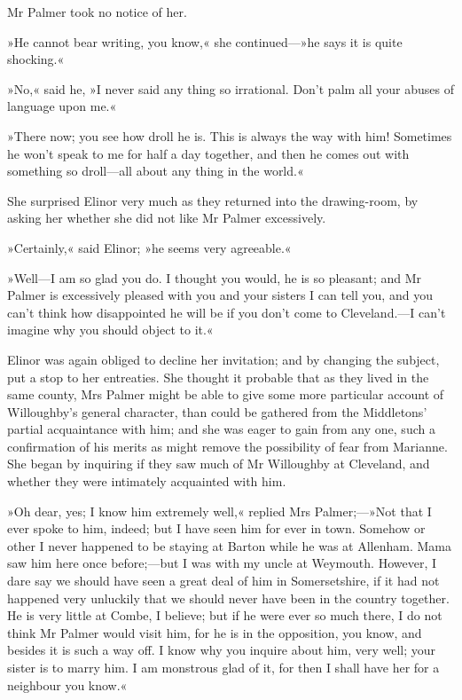 Mr Palmer took no notice of her.

»He cannot bear writing, you know,« she continued—»he says it is quite shocking.«

»No,« said he, »I never said any thing so irrational. Don’t palm all your abuses of language upon me.«

»There now; you see how droll he is. This is always the way with him! Sometimes he won’t speak to me for half a day together, and then he comes out with something so droll—all about any thing in the world.«

She surprised Elinor very much as they returned into the drawing-room, by asking her whether she did not like Mr Palmer excessively.

»Certainly,« said Elinor; »he seems very agreeable.«

»Well—I am so glad you do. I thought you would, he is so pleasant; and Mr Palmer is excessively pleased with you and your sisters I can tell you, and you can’t think how disappointed he will be if you don’t come to Cleveland.—I can’t imagine why you should object to it.«

Elinor was again obliged to decline her invitation; and by changing the subject, put a stop to her entreaties. She thought it probable that as they lived in the same county, Mrs Palmer might be able to give some more particular account of Willoughby’s general character, than could be gathered from the Middletons’ partial acquaintance with him; and she was eager to gain from any one, such a confirmation of his merits as might remove the possibility of fear from Marianne. She began by inquiring if they saw much of Mr Willoughby at Cleveland, and whether they were intimately acquainted with him.

»Oh dear, yes; I know him extremely well,« replied Mrs Palmer;—»Not that I ever spoke to him, indeed; but I have seen him for ever in town. Somehow or other I never happened to be staying at Barton while he was at Allenham. Mama saw him here once before;—but I was with my uncle at Weymouth. However, I dare say we should have seen a great deal of him in Somersetshire, if it had not happened very unluckily that we should never have been in the country together. He is very little at Combe, I believe; but if he were ever so much there, I do not think Mr Palmer would visit him, for he is in the opposition, you know, and besides it is such a way off. I know why you inquire about him, very well; your sister is to marry him. I am monstrous glad of it, for then I shall have her for a neighbour you know.«

